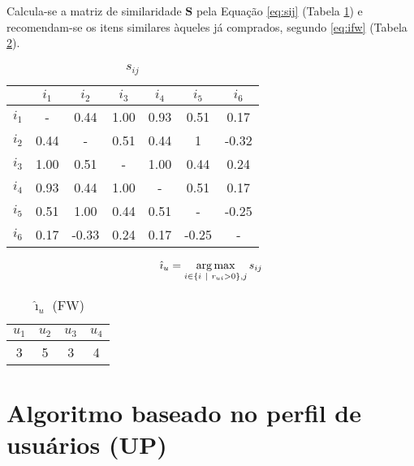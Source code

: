 Calcula-se a matriz de similaridade $\mathbf{S}$ pela Equação \ref{eq:sij} (Tabela \ref{tab:sij}) e recomendam-se os itens similares àqueles já comprados, segundo \ref{eq:ifw} (Tabela \ref{tab:i_u_fw}).

\begin{table}[p]
\begin{center}
    \caption{$s_{ij}$}
    \label{tab:sij}
    \begin{tabular}{ | c | c | c | c | c | c | c | } 
    \hline
     & $i_1$ & $i_2$ & $i_3$ & $i_4$ & $i_5$ & $i_6$  \\ \hline
     $i_1$ & - &  0.44 & 1.00 & 0.93 &  0.51 &  0.17 \\ \hline
     $i_2$ & 0.44 &         - & 0.51 & 0.44 &  1 & -0.32  \\ \hline
     $i_3$ & 1.00 &  0.51 &        - & 1.00 &  0.44 &  0.24 \\ \hline
     $i_4$ & 0.93 &  0.44 & 1.00 &        - &  0.51 &  0.17 \\ \hline
     $i_5$ & 0.51 &  1.00 & 0.44 & 0.51 &         - & -0.25 \\ \hline
     $i_6$ & 0.17 & -0.33 & 0.24 & 0.17 & -0.25 &         - \\ \hline
    \end{tabular}
\end{center}
\end{table}



\begin{equation}
\label{eq:ifw} 
    \hat{\imath}_u = \operatorname*{arg\,max}_{i \in \left\{i~|~r_{ui} > 0\right\}, j}{s_{ij}}
\end{equation} 


\begin{table}[p]
\begin{center}
    \caption{$\hat{\imath}_u$ (FW)}
    \label{tab:i_u_fw}
    \begin{tabular}{ | c | c | c | c | } 
    \hline
     $u_1$ & $u_2$ & $u_3$ & $u_4$   \\ \hline
     3 & 5 & 3 & 4  \\ \hline
    \end{tabular}
\end{center}
\end{table}


\section{Algoritmo baseado no perfil de usuários (UP)} %
\label{sec:algoritmo_baseado_no_perfil_de_usu_rios_}

